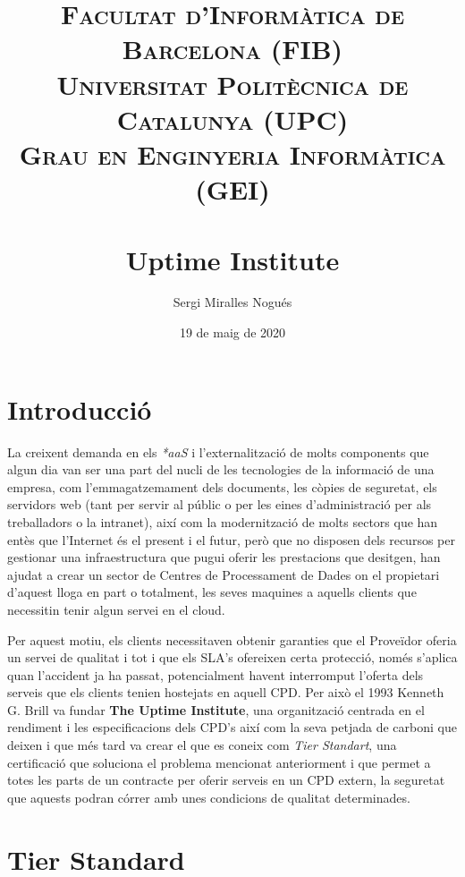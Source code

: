 \documentclass[11pt,a4paper,titlepage]{article}
\author{  \LARGE Sergi Miralles Nogués }
\title{\vspace{-15mm}\textsc{\Large Facultat d'Informàtica de Barcelona (FIB)}\\\textsc{\Large Universitat Politècnica de Catalunya (UPC)\vspace{5mm}}\\\textsc{\large Grau en Enginyeria Informàtica (GEI)}\\\textsc{\large}\\{\vspace{30mm}\huge \bfseries \fontfamily{lmss}\selectfont Uptime Institute} \\ {\vspace{20mm} \LARGE \textsc{}}}
\date{19 de maig de 2020}
\begin{document}
	\maketitle
    
    \tableofcontents
    
    \newpage
    
    \section{Introducció}
    La creixent demanda en els \textit{*aaS} i l'externalització de molts components que algun dia van ser una part del nucli de les tecnologies de la informació de una empresa, com l'emmagatzemament dels documents, les còpies de seguretat, els servidors web (tant per servir al públic o per les eines d'administració per als treballadors o la intranet), així com la modernització de molts sectors que han entès que l'Internet és el present i el futur, però que no disposen dels recursos per gestionar una infraestructura que pugui oferir les prestacions que desitgen, han ajudat a crear un sector de Centres de Processament de Dades on el propietari d'aquest lloga en part o totalment, les seves maquines a aquells clients que necessitin tenir algun servei en el cloud.
    
    Per aquest motiu, els clients necessitaven obtenir garanties que el Proveïdor oferia un servei de qualitat i tot i que els SLA's ofereixen certa protecció, només s'aplica quan l'accident ja ha passat, potencialment havent interromput l'oferta dels serveis que els clients tenien hostejats en aquell CPD. Per això el 1993 Kenneth G. Brill va fundar \textbf{The Uptime Institute}, una organització centrada en el rendiment i les especificacions dels CPD's així com la seva petjada de carboni que deixen i que més tard va crear el que es coneix com \textit{Tier Standart}, una certificació que soluciona el problema mencionat anteriorment i que permet a totes les parts de un contracte per oferir serveis en un CPD extern, la seguretat que aquests podran córrer amb unes condicions de qualitat determinades. 

    
    \section{Tier Standard}
    
\end{document}
